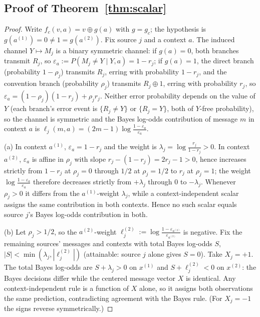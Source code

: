 \subsection{Proof of Theorem~\ref{thm:scalar}}
\begin{proof}
Write $f_c(v,a) = v \oplus g(a)$ with $g = g_c$; the hypothesis is
$g(a^{(1)}) = 0 \neq 1 = g(a^{(2)})$. Fix source $j$ and a context $a$.
The induced channel $Y \mapsto M_j$ is a binary symmetric channel: if
$g(a) = 0$, both branches transmit $R_j$, so
$\varepsilon_a := P(M_j \neq Y \mid Y, a) = 1 - r_j$; if $g(a) = 1$, the
direct branch (probability $1-\rho_j$) transmits $R_j$, erring with
probability $1-r_j$, and the convention branch (probability $\rho_j$)
transmits $R_j \oplus 1$, erring with probability $r_j$, so
$\varepsilon_a = (1-\rho_j)(1-r_j) + \rho_j r_j$. Neither error
probability depends on the value of $Y$ (each branch's error event is
$\{R_j \neq Y\}$ or $\{R_j = Y\}$, both of $Y$-free probability), so the
channel is symmetric and the Bayes log-odds contribution of message
$m$ in context $a$ is
$\ell_j(m,a) = (2m-1)\log\frac{1-\varepsilon_a}{\varepsilon_a}$.

(a) In context $a^{(1)}$, $\varepsilon_a = 1-r_j$ and the weight is
$\lambda_j = \log\frac{r_j}{1-r_j} > 0$. In context $a^{(2)}$,
$\varepsilon_a$ is affine in $\rho_j$ with slope
$r_j - (1-r_j) = 2r_j - 1 > 0$, hence increases strictly from
$1-r_j$ at $\rho_j = 0$ through $1/2$ at $\rho_j = 1/2$ to $r_j$ at
$\rho_j = 1$; the weight $\log\frac{1-\varepsilon_a}{\varepsilon_a}$
therefore decreases strictly from $+\lambda_j$ through $0$ to
$-\lambda_j$. Whenever $\rho_j > 0$ it differs from the
$a^{(1)}$-weight $\lambda_j$, while a context-independent scalar
assigns the same contribution in both contexts. Hence no such scalar
equals source $j$'s Bayes log-odds contribution in both.

(b) Let $\rho_j > 1/2$, so the $a^{(2)}$-weight
$\ell_j^{(2)} := \log\frac{1-\varepsilon_{a^{(2)}}}{\varepsilon_{a^{(2)}}}$
is negative. Fix the remaining sources' messages and contexts with
total Bayes log-odds $S$, $|S| < \min(\lambda_j, |\ell_j^{(2)}|)$
(attainable: source $j$ alone gives $S = 0$). Take $X_j = +1$. The
total Bayes log-odds are $S + \lambda_j > 0$ on $x^{(1)}$ and
$S + \ell_j^{(2)} < 0$ on $x^{(2)}$: the Bayes decisions differ while
the centered message vector $X$ is identical. Any context-independent
rule is a function of $X$ alone, so it assigns both observations the
same prediction, contradicting agreement with the Bayes rule. (For
$X_j = -1$ the signs reverse symmetrically.)
\end{proof}

